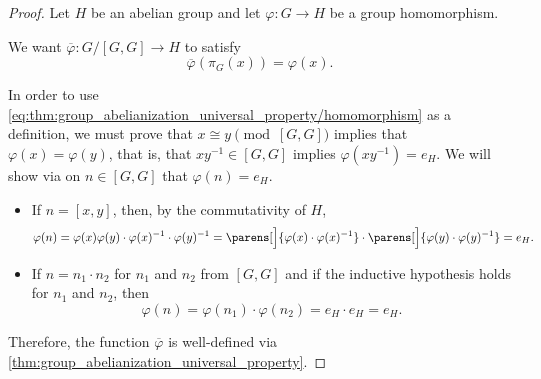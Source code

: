 \begin{proof}
  Let \( H \) be an abelian group and let \( \varphi: G \to H \) be a group homomorphism.

  We want \( \overline{\varphi}: G / [G, G] \to H \) to satisfy
  \begin{equation}\label{eq:thm:group_abelianization_universal_property/homomorphism}
    \overline{\varphi}(\pi_G(x)) = \varphi(x).
  \end{equation}

  In order to use \eqref{eq:thm:group_abelianization_universal_property/homomorphism} as a definition, we must prove that \( x \cong y \pmod {[G, G]} \) implies that \( \varphi(x) = \varphi(y) \), that is, that \( xy^{-1} \in [G, G] \) implies \( \varphi(xy^{-1}) = e_H \). We will show via  on \( n \in [G, G] \) that \( \varphi(n) = e_H \).
  \begin{itemize}
    \item If \( n = [x, y] \), then, by the commutativity of \( H \),
    \begin{equation*}
      \varphi(n)
      =
      \varphi(x) \varphi(y) \cdot \varphi(x)^{-1} \cdot \varphi(y)^{-1}
      =
      \parens[\Big]{ \varphi(x) \cdot \varphi(x)^{-1} } \cdot \parens[\Big]{ \varphi(y) \cdot \varphi(y)^{-1} }
      =
      e_H.
    \end{equation*}

    \item If \( n = n_1 \cdot n_2 \) for \( n_1 \) and \( n_2 \) from \( [G, G] \) and if the inductive hypothesis holds for \( n_1 \) and \( n_2 \), then
    \begin{equation*}
      \varphi(n)
      =
      \varphi(n_1) \cdot \varphi(n_2)
      =
      e_H \cdot e_H
      =
      e_H.
    \end{equation*}
  \end{itemize}

  Therefore, the function \( \overline{\varphi} \) is well-defined via \eqref{thm:group_abelianization_universal_property}.
\end{proof}
